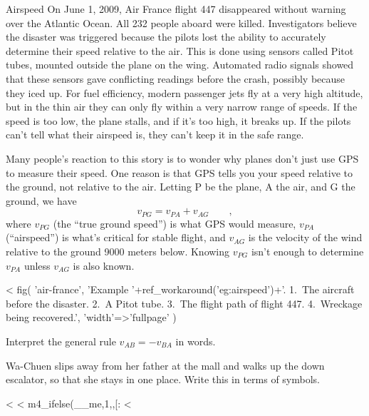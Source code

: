 \begin{eg}{Airspeed}\label{eg:airspeed}
On June 1, 2009, Air France flight 447 disappeared without warning over the Atlantic Ocean.
All 232 people aboard were killed.
Investigators believe the disaster was triggered because the pilots lost the ability to
accurately determine their speed relative to the air. This is done using sensors called Pitot
tubes, mounted outside the plane on the wing. Automated radio signals showed that these sensors
gave conflicting readings before the crash, possibly because they iced up. For fuel efficiency,
modern passenger jets fly at a very high altitude, but in the thin air they
can only fly within a very narrow range of speeds. If the speed is too low, the plane stalls, and
if it's too high, it breaks up. If the pilots can't tell what their airspeed is, they can't
keep it in the safe range.

Many people's reaction to this story is to wonder why planes don't just use GPS to measure their
speed. One reason is that GPS tells you your speed relative to the ground, not relative to the
air. Letting P be the plane, A the air, and G the ground, we have
\begin{equation*}
  v_{PG} = v_{PA}+v_{AG} \qquad ,
\end{equation*}
where $v_{PG}$ (the ``true ground speed'') is what GPS would measure, $v_{PA}$ (``airspeed'')
is what's critical for stable flight, and $v_{AG}$ is the velocity of the wind relative to
the ground 9000 meters below. Knowing $v_{PG}$ isn't enough to determine $v_{PA}$ unless
$v_{AG}$ is also known.
\end{eg}

<%
  fig(   
    'air-france',
    'Example '+ref_workaround('eg:airspeed')+'. 1.~The aircraft before the disaster. 2.~A Pitot tube. 3.~The flight path of flight 447. 4.~Wreckage being recovered.',
    {
      'width'=>'fullpage'
    }
  )

\startdqs

\begin{dq}
Interpret the general rule $v_{AB}=-v_{BA}$ in words.
\end{dq}

\begin{dq}
Wa-Chuen slips away from her father at the mall and walks
up the down escalator, so that she stays in one place. Write
this in terms of symbols.
\end{dq}

<%
<%
m4_ifelse(__me,1,,[:
<%

